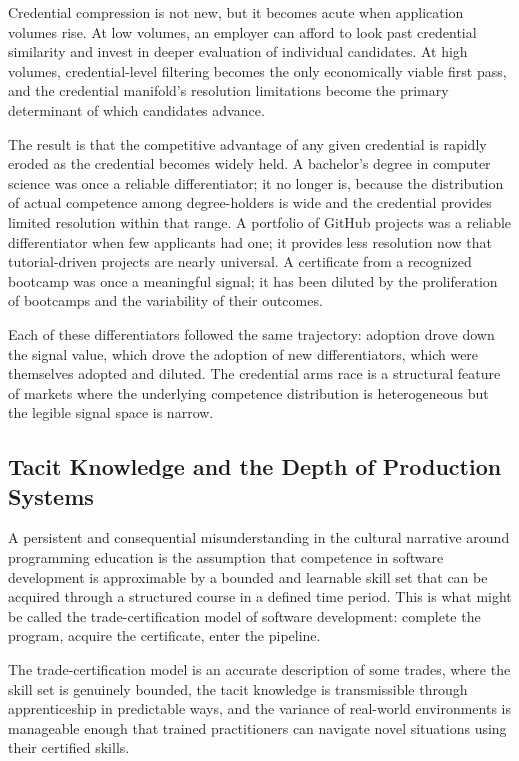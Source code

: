 \documentclass[12pt, a4paper]{article}
\theoremstyle{plain}
\theoremstyle{definition}
\theoremstyle{remark}
\begin{document}
Credential compression is not new, but it becomes acute when application volumes rise.
At low volumes, an employer can afford to look past credential similarity
and invest in deeper evaluation of individual candidates.
At high volumes, credential-level filtering becomes the only economically viable
first pass, and the credential manifold's resolution limitations become
the primary determinant of which candidates advance.

The result is that the competitive advantage of any given credential is rapidly eroded
as the credential becomes widely held.
A bachelor's degree in computer science was once a reliable differentiator;
it no longer is, because the distribution of actual competence among
degree-holders is wide and the credential provides limited resolution within that range.
A portfolio of GitHub projects was a reliable differentiator when few applicants had one;
it provides less resolution now that tutorial-driven projects are nearly universal.
A certificate from a recognized bootcamp was once a meaningful signal;
it has been diluted by the proliferation of bootcamps and the variability of their outcomes.

Each of these differentiators followed the same trajectory:
adoption drove down the signal value, which drove the adoption of new differentiators,
which were themselves adopted and diluted.
The credential arms race is a structural feature of markets
where the underlying competence distribution is heterogeneous
but the legible signal space is narrow.

\subsection{Tacit Knowledge and the Depth of Production Systems}

A persistent and consequential misunderstanding in the cultural narrative
around programming education is the assumption that competence in software development
is approximable by a bounded and learnable skill set that can be acquired
through a structured course in a defined time period.
This is what might be called the trade-certification model of software development:
complete the program, acquire the certificate, enter the pipeline.

The trade-certification model is an accurate description of some trades,
where the skill set is genuinely bounded, the tacit knowledge is transmissible
through apprenticeship in predictable ways, and the variance of real-world environments
is manageable enough that trained practitioners can navigate novel situations
using their certified skills.
\end{document}
